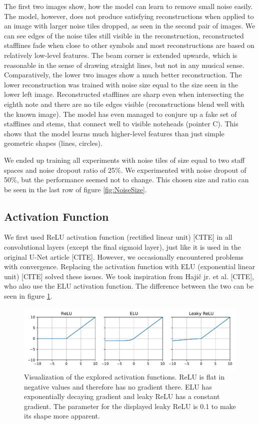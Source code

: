 The first two images show, how the model can learn to remove small noise easily. The model, however, does not produce satisfying reconstructions when applied to an image with larger noise tiles dropped, as seen in the second pair of images. We can see edges of the noise tiles still visible in the reconstruction, reconstructed stafflines fade when close to other symbols and most reconstructions are based on relatively low-level features. The beam corner is extended upwards, which is reasonable in the sense of drawing straight lines, but not in any musical sense. Comparatively, the lower two images show a much better reconstruction. The lower reconstruction was trained with noise size equal to the size seen in the lower left image. Reconstructed stafflines are sharp even when intersecting the eighth note and there are no tile edges visible (reconstructions blend well with the known image). The model has even managed to conjure up a fake set of stafflines and stems, that connect well to visible noteheads (pointer C). This shows that the model learns much higher-level features than just simple geometric shapes (lines, circles).

We ended up training all experiments with noise tiles of size equal to two staff spaces and noise dropout ratio of 25\%. We experimented with noise dropout of 50\%, but the performance seemed not to change. This chosen size and ratio can be seen in the last row of figure \ref{fig:NoiseSize}.


\subsection{Activation Function}
\label{sec:ActivationFunction}

We first used ReLU activation function (rectified linear unit) [CITE] in all convolutional layers (except the final sigmoid layer), just like it is used in the original U-Net article [CITE]. However, we occasionally encountered problems with convergence. Replacing the activation function with ELU (exponential linear unit) [CITE] solved these issues. We took inspiration from Hajič jr. et al. [CITE], who also use the ELU activation function. The difference between the two can be seen in figure \ref{fig:ActivationFunctions}.

\begin{figure}[ht]
    \centering
    \includegraphics[width=140mm]{../../figures/03-activation-function/functions.pdf}
    \caption{Visualization of the explored activation functions. ReLU is flat in negative values and therefore has no gradient there. ELU has exponentially decaying gradient and leaky ReLU has a constant gradient. The parameter for the displayed leaky ReLU is 0.1 to make its shape more apparent.}
    \label{fig:ActivationFunctions}
\end{figure}

